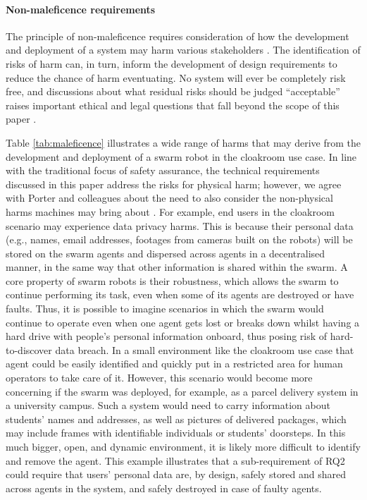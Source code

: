 \documentclass[lettersize,journal]{IEEEtran}
\begin{document}
\paragraph{Non-maleficence requirements}
The principle of non-maleficence requires consideration of how the development and deployment of a system may harm various stakeholders \cite{Porter2022}. The identification of risks of harm can, in turn, inform the development of design requirements to reduce the chance of harm eventuating. No system will ever be completely risk free, and discussions about what residual risks should be judged “acceptable” raises important ethical and legal questions that fall beyond the scope of this paper \cite{fraser2021residual}.

Table \ref{tab:maleficence} illustrates a wide range of harms that may derive from the development and deployment of a swarm robot in the cloakroom use case. In line with the traditional focus of safety assurance, the technical requirements discussed in this paper address the risks for physical harm; however, we agree with Porter and colleagues about the need to also consider  the non-physical harms machines may bring about \cite{Porter2022}. For example, end users in the cloakroom scenario may experience data privacy harms. This is because their personal data (e.g., names, email addresses, footages from cameras built on the robots) will be stored on the swarm agents and dispersed across agents in a decentralised manner, in the same way that other information is shared within the swarm. A core property of swarm robots is their robustness, which allows the swarm to continue performing its task, even when some of its agents are destroyed or have faults. Thus, it is possible to imagine scenarios in which the swarm would continue to operate even when one agent gets lost or breaks down whilst having a hard drive with people’s personal information onboard, thus posing risk of hard-to-discover data breach. In a small environment like the cloakroom use case that agent could be easily identified and quickly put in a restricted area for human operators to take care of it. However, this scenario would become more concerning if the swarm was deployed, for example, as a parcel delivery system in a university campus. Such a system would need to carry information about students’ names and addresses, as well as pictures of delivered packages, which may include frames with identifiable individuals or students’ doorsteps. In this much bigger, open, and dynamic environment, it is likely more difficult to identify and remove the agent. This example illustrates that a sub-requirement of RQ2 could require that users’ personal data are, by design, safely stored and shared across agents in the system, and safely destroyed in case of faulty agents.  
\\
\end{document}
